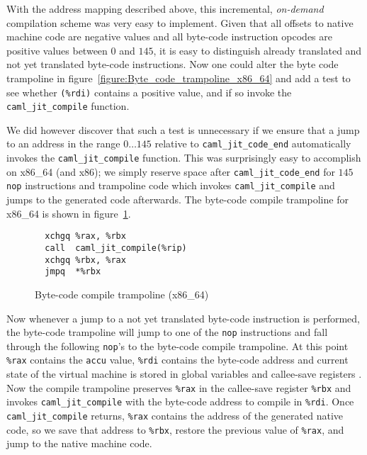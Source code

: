 \documentclass[10pt,a4paper,twocolumn]{article}
\begin{document}
With the address mapping described above, this incremental, \emph{on-demand} compilation scheme
was very easy to implement. Given that all offsets to native machine code are negative values and
all byte-code instruction opcodes are positive values between $0$ and $145$, it is easy to distinguish
already translated and not yet translated byte-code instructions. Now one could alter the byte code
trampoline in figure~\ref{figure:Byte_code_trampoline_x86_64} and add a test to see whether \texttt{(\%rdi)}
contains a positive value, and if so invoke the \texttt{caml\_jit\_compile} function.

We did however discover that such a test is unnecessary if we ensure that a jump to an address in
the range $0 \ldots 145$ relative to \texttt{caml\_jit\_code\_end} automatically invokes the
\texttt{caml\_jit\_compile} function. This was surprisingly easy to accomplish on x86\_64 (and
x86); we simply reserve space after \texttt{caml\_jit\_code\_end} for $145$ \texttt{nop} instructions
and trampoline code which invokes \texttt{caml\_jit\_compile} and jumps to the generated code afterwards.
The byte-code compile trampoline for x86\_64 is shown in figure~\ref{figure:Byte_code_compile_trampoline_x86_64}.

\begin{figure}[ht]
  \centering
  \begin{verbatim}
  xchgq %rax, %rbx
  call  caml_jit_compile(%rip)
  xchgq %rbx, %rax
  jmpq  *%rbx
\end{verbatim}
  \caption{Byte-code compile trampoline (x86\_64)}
  \label{figure:Byte_code_compile_trampoline_x86_64}
\end{figure}

Now whenever a jump to a not yet translated byte-code instruction is performed, the byte-code trampoline
will jump to one of the \texttt{nop} instructions and fall through the following \texttt{nop}'s to the
byte-code compile trampoline. At this point \texttt{\%rax} contains the \texttt{accu} value, \texttt{\%rdi}
contains the byte-code address and current state of the virtual machine is stored in global variables
and callee-save registers \cite{Matz10}. Now the compile trampoline preserves \texttt{\%rax} in the
callee-save register \texttt{\%rbx} and invokes \texttt{caml\_jit\_compile} with the byte-code address to
compile in \texttt{\%rdi}. Once \texttt{caml\_jit\_compile} returns, \texttt{\%rax} contains the
address of the generated native code, so we save that address to \texttt{\%rbx}, restore the previous
value of \texttt{\%rax}, and jump to the native machine code.
\end{document}
